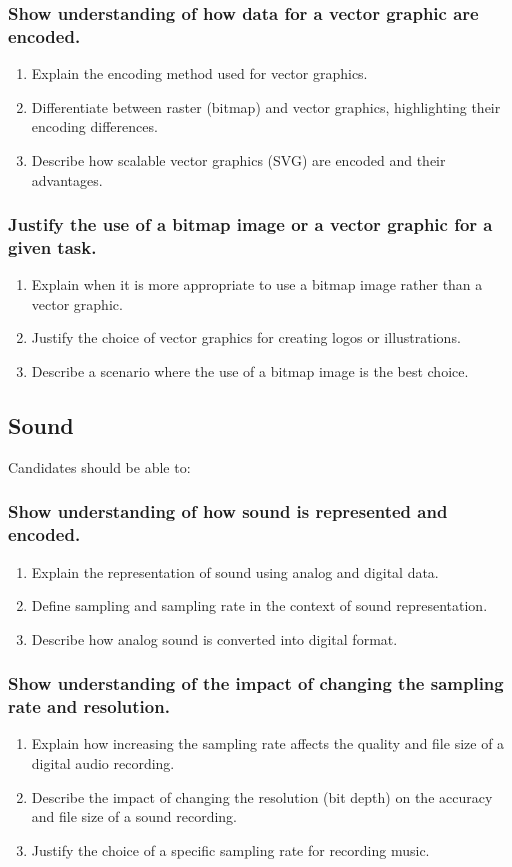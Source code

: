 \documentclass[a4paper]{article}
\begin{document}
\subsubsection{Show understanding of how data for a vector graphic are encoded.}
\begin{enumerate}
  \item Explain the encoding method used for vector graphics.
  \item Differentiate between raster (bitmap) and vector graphics, highlighting their encoding differences.
  \item Describe how scalable vector graphics (SVG) are encoded and their advantages.
\end{enumerate}

\subsubsection{Justify the use of a bitmap image or a vector graphic for a given task.}
\begin{enumerate}
  \item Explain when it is more appropriate to use a bitmap image rather than a vector graphic.
  \item Justify the choice of vector graphics for creating logos or illustrations.
  \item Describe a scenario where the use of a bitmap image is the best choice.
\end{enumerate}

\subsection{Sound}
Candidates should be able to:
\subsubsection{Show understanding of how sound is represented and encoded.}
\begin{enumerate}
  \item Explain the representation of sound using analog and digital data.
  \item Define sampling and sampling rate in the context of sound representation.
  \item Describe how analog sound is converted into digital format.
\end{enumerate}

\subsubsection{Show understanding of the impact of changing the sampling rate and resolution.}
\begin{enumerate}
  \item Explain how increasing the sampling rate affects the quality and file size of a digital audio recording.
  \item Describe the impact of changing the resolution (bit depth) on the accuracy and file size of a sound recording.
  \item Justify the choice of a specific sampling rate for recording music.
\end{enumerate}
\end{document}
